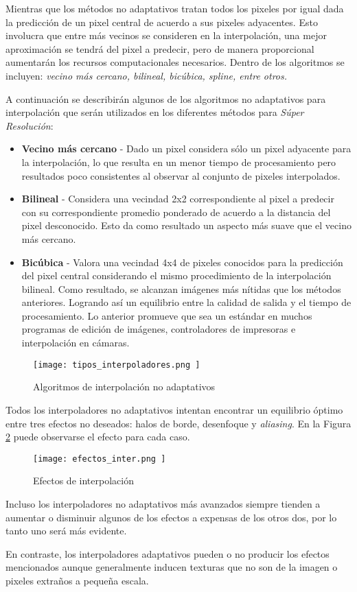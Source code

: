 Mientras que los métodos no adaptativos tratan todos los pixeles por igual
dada la predicción de un pixel central de acuerdo a sus pixeles adyacentes. Esto 
involucra que entre más vecinos se consideren en la interpolación, una mejor 
aproximación se tendrá del pixel a predecir, pero de manera proporcional 
aumentarán los recursos computacionales necesarios. Dentro de los algoritmos 
se incluyen: \emph{vecino más cercano, bilineal, bicúbica, spline, entre otros.}

A continuación se describirán algunos de los algoritmos no adaptativos para 
interpolación que serán utilizados en los diferentes métodos para \emph{Súper
Resolución}:
\begin{itemize}
    \item \textbf{Vecino más cercano} - Dado un pixel considera sólo un pixel 
    adyacente para la interpolación, lo que resulta en un menor tiempo de procesamiento
    pero resultados poco consistentes al observar al conjunto de pixeles interpolados. 
    \item \textbf{Bilineal} - Considera una vecindad 2x2 correspondiente al pixel
    a predecir con su correspondiente promedio ponderado de acuerdo a la distancia
    del pixel desconocido. Esto da como resultado un aspecto más suave que el vecino
    más cercano. 
    \item \textbf{Bicúbica} - Valora una vecindad 4x4 de pixeles conocidos para la
    predicción del pixel central considerando el mismo procedimiento de la 
    interpolación bilineal. Como resultado, se alcanzan imágenes más nítidas que los 
    métodos anteriores. Logrando así un equilibrio entre la calidad de salida y el 
    tiempo de procesamiento. Lo anterior promueve que sea un estándar en muchos programas
    de edición de imágenes, controladores de impresoras e interpolación en cámaras. 
\end{itemize}
\begin{figure}[H]
    \texttt{[image:  tipos\_interpoladores.png ]}
    \centering
    \caption{ Algoritmos de interpolación no adaptativos }
    \label{fig:interpoladores}
\end{figure}
Todos los interpoladores no adaptativos intentan encontrar un equilibrio óptimo
entre tres efectos no deseados: halos de borde, desenfoque y \emph{aliasing}. En la 
Figura \ref{fig:efectos_inter} puede observarse el efecto para cada caso. 

\begin{figure}[H]
    \texttt{[image:  efectos\_inter.png ]}
    \centering
    \caption{ Efectos de interpolación}
    \label{fig:efectos_inter}
\end{figure}

Incluso los interpoladores no adaptativos más avanzados siempre tienden a aumentar
o disminuir algunos de los efectos a expensas de los otros dos, por lo tanto uno 
será más evidente. 

En contraste, los interpoladores adaptativos pueden o no producir los efectos 
mencionados aunque generalmente inducen texturas que no son de la imagen o 
pixeles extraños a pequeña escala.

